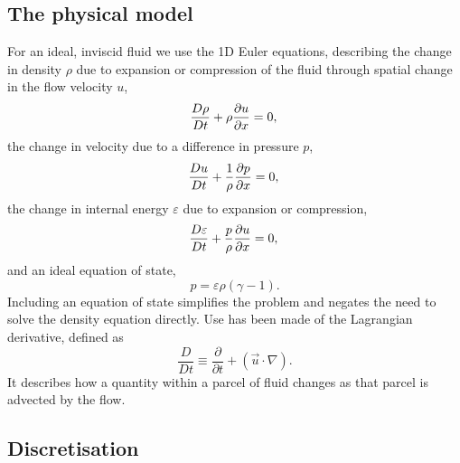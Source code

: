 \subsection{The physical model}
For an ideal, inviscid fluid we use the 1D Euler equations, describing the change in density $\rho$ due to expansion or compression of the fluid through spatial change in the flow velocity $u$,
\begin{equation}
  \frac{D \rho}{Dt} + \rho\frac{\partial u}{\partial x} = 0,\\
  \label{eqn-lare1d-density}
\end{equation}
the change in velocity due to a difference in pressure $p$,
\begin{equation}
  \frac{D u}{Dt} + \frac{1}{\rho}\frac{\partial p}{\partial x} = 0,\\
  \label{eqn-lare1d-velocity}
\end{equation}
the change in internal energy $\varepsilon$ due to expansion or compression,
\begin{equation}
  \frac{D \varepsilon}{Dt} + \frac{p}{\rho}\frac{\partial u}{\partial x} = 0,\\
  \label{eqn-lare1d-energy}
\end{equation}
and an ideal equation of state,
\begin{equation}
  p = \varepsilon\rho(\gamma - 1).
  \label{eqn-lare1d-equation-of-state}
\end{equation}
Including an equation of state simplifies the problem and negates the need to solve the density equation directly. Use has been made of the Lagrangian derivative, defined as
\begin{equation}
  \frac{D }{Dt} \equiv \frac{\partial}{\partial t} + (\vec{u} \cdot \nabla).
\end{equation}
It describes how a quantity within a parcel of fluid changes as that parcel is advected by the flow. 

\subsection{Discretisation} 

